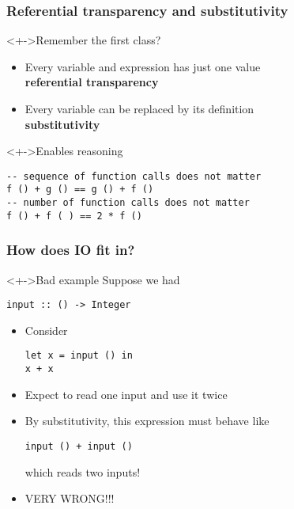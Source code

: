 \documentclass{beamer}
\subtitle{IO}
\begin{document}
\begin{frame}
  \titlepage
\end{frame}
\begin{frame}[fragile]
  \frametitle{Referential transparency and substitutivity}
  \begin{block}<+->{Remember the first class?}
    \begin{itemize}
    \item Every variable and expression has just one value\\
      \textbf{referential transparency}
    \item Every variable can be replaced by its definition\\
      \textbf{substitutivity}
    \end{itemize}
  \end{block}
  \begin{block}<+->{Enables reasoning}
\begin{verbatim}
-- sequence of function calls does not matter
f () + g () == g () + f ()
-- number of function calls does not matter
f () + f ( ) == 2 * f ()
\end{verbatim}
  \end{block}
\end{frame}
\begin{frame}[fragile]
  \frametitle{How does IO fit in?}
  \begin{alertblock}<+->{Bad example}
    Suppose we had 
\begin{verbatim}
input :: () -> Integer
\end{verbatim}
    \begin{itemize}
    \item<+-> Consider
\begin{verbatim}
let x = input () in
x + x
\end{verbatim}
    \item<+-> Expect to read one input and use it twice
    \item<+-> By substitutivity, this expression must behave like
\begin{verbatim}
input () + input ()
\end{verbatim}
      which reads two inputs!
    \item<+-> VERY WRONG!!!
  \end{itemize}
  \end{alertblock}
\end{frame}
\end{document}
